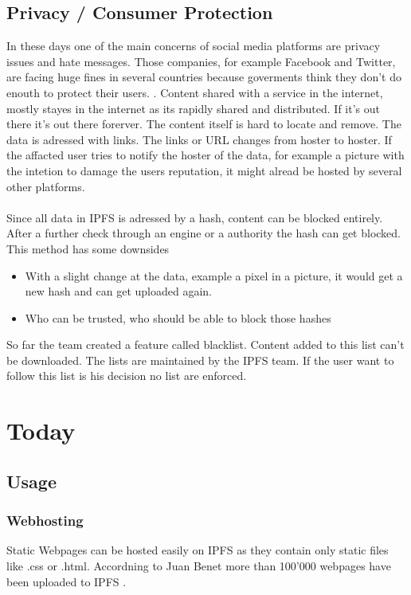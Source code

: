 \documentclass[a4paper,11pt, oneside]{report}
\theoremstyle{definition}
\begin{document}
\section{Privacy / Consumer Protection}
In these days one of the main concerns of social media platforms are privacy issues and hate messages. Those companies, for example Facebook and Twitter, are facing huge fines in several countries because goverments think they don't do enouth to protect their users. \cite{HateSpeech}. Content shared with a service in the internet, mostly stayes in the internet as its rapidly shared and distributed. If it's out there it's out there forerver. The content itself is hard to locate and remove. The data is adressed with links. The links or URL changes from hoster to hoster. If the affacted user tries to notify the hoster of the data, for example a picture with the intetion to damage the users reputation, it might alread be hosted by several other platforms.\\ \\
Since all data in IPFS is adressed by a hash, content can be blocked entirely. After a further check through an engine or a authority the hash can get blocked. This method has some downsides
\begin{itemize} 
\item With a slight change at the data, example a pixel in a picture, it would get a new hash and can get uploaded again.
\item Who can be trusted, who should be able to block those hashes
\end{itemize}
So far the team created a feature called blacklist. Content added to this list can't be downloaded. The lists are maintained by the IPFS team. If the user want to follow this list is his decision no list are enforced.

\newpage
\chapter{Today}

\section{Usage}
\subsection{Webhosting}
Static Webpages can be hosted easily on IPFS as they contain only static files like .css or .html.
Accordning to Juan Benet more than 100'000 webpages have been uploaded to IPFS \cite{ipfs-usage-web}.
\end{document}
